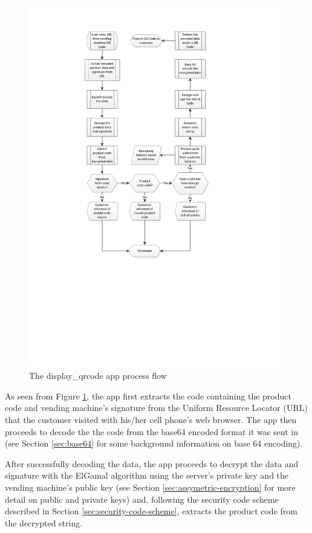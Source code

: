 \begin{figure}[h]
 \centering 
 \includegraphics[clip=true, trim = 0 250 0 50,
 scale=0.7]{qrcode_processflow_server_bak}
 \caption{The display\_qrcode app process flow}
 \label{fig:disp-qrcode}
\end{figure}

As seen from Figure \ref{fig:disp-qrcode}, the app first extracts the code containing the
product code and vending machine's signature from the Uniform Resource Locator (URL) that the
customer visited with his/her cell phone's web browser. The app then proceeds to decode the
the code from the base64 encoded format it was sent in (see Section \ref{sec:base64} for some
background information on base 64 encoding).

After successfully decoding the data, the app proceeds to decrypt the data and signature with the ElGamal
algorithm using the server's private key and the vending machine's public key
(see Section \ref{sec:assymetric-encryption} for more detail on public and private keys) and, following the
security code scheme described in Section \ref{sec:security-code-scheme}, extracts the product
code from the decrypted string.

